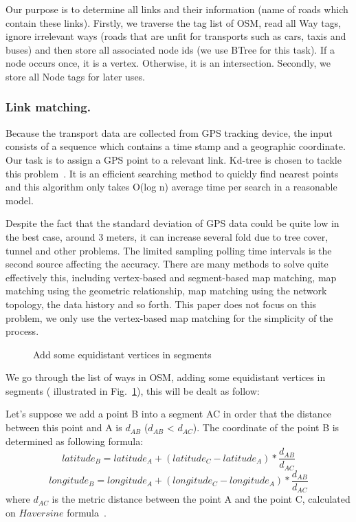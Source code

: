 \documentclass{acm_proc_article-sp}
\begin{document}
		\setlength{\parindent}{0.7cm} Our purpose is to determine all links and their information (name of roads which contain these links). Firstly, we traverse the tag list of OSM, read all Way tags, ignore irrelevant ways (roads that are unfit for transports such as cars, taxis and buses) and then store all associated node ids (we use BTree for this task). If a node occurs once, it is a vertex. Otherwise, it is an intersection. Secondly, we store all Node tags for later uses.
	
\subsubsection{Link matching.}
	
	Because the transport data are collected from GPS tracking device, the input consists of a sequence which contains a time stamp and a geographic coordinate. Our task is to assign a GPS point to a relevant link. Kd-tree is chosen to tackle this problem~\cite{moh2013approximate}. It is an efficient searching method to quickly find nearest points and this algorithm only takes O(log n) average time per search in a reasonable model.
	
	\setlength{\parindent}{0.7cm} Despite the fact that the standard deviation of GPS data could be quite low in the best case, around 3 meters, it can increase several fold due to tree cover, tunnel and other problems. The limited sampling polling time intervals is the second source affecting the accuracy. There are many methods to solve quite effectively this, including vertex-based and segment-based map matching, map matching using the geometric relationship, map matching using the network topology, the data history and so forth. This paper does not focus on this problem, we only use the vertex-based map matching for the simplicity of the process.  
	
\begin{figure}[h]
\centering
{}
\caption{Add some equidistant vertices in segments}
\label{fig:addPointsToRoad}
\end{figure}
	
	 \setlength{\parindent}{0.7cm} We go through the list of ways in OSM, adding some equidistant vertices in segments ( illustrated in Fig.~\ref{fig:addPointsToRoad}), this will be dealt as follow: 

	Let's suppose we add a point B into a segment AC in order that the distance between this point and A is $d_{AB}$ ($d_{AB}$ < $d_{AC}$). The coordinate of the point B is determined as following formula:
\[ latitude_{B} = latitude_{A} + (latitude_{C} - latitude_{A}) \ast \frac{d_{AB}}{d_{AC}}\]
\[ longitude_{B} = longitude_{A} + (longitude_{C} - longitude_{A}) \ast \frac{d_{AB}}{d_{AC}}\]
where $d_{AC}$ is the metric distance between the point A and the point C, calculated on $Haversine$ formula~\cite{haversineweb}.
\end{document}
